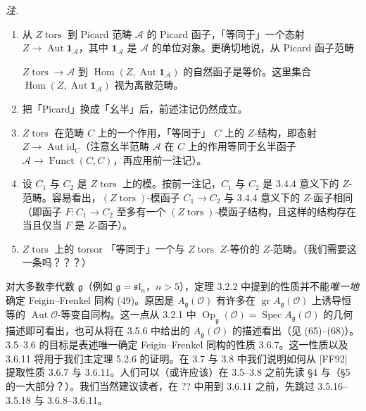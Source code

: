 \emph{注.}
\begin{enumerate}[label=(\roman*),leftmargin=2.2em]
  \item 从 $Z\operatorname{tors}$ 到 Picard 范畴 $\mathcal{A}$ 的 Picard 函子，「等同于」一个态射 $Z\to\operatorname{Aut}\mathbf{1}_{\mathcal{A}}$，其中 $\mathbf{1}_{\mathcal{A}}$ 是 $\mathcal{A}$ 的单位对象。更确切地说，从 Picard 函子范畴

$Z\operatorname{tors}\to\mathcal{A}$ 到 $\operatorname{Hom}(Z,\operatorname{Aut}\mathbf{1}_{\mathcal{A}})$ 的自然函子是等价。这里集合 $\operatorname{Hom}(Z,\operatorname{Aut}\mathbf{1}_{\mathcal{A}})$ 视为离散范畴。
  \item 把「Picard」换成「幺半」后，前述注记仍然成立。
  \item $Z\operatorname{tors}$ 在范畴 $C$ 上的一个作用，「等同于」 $C$ 上的 $Z$-结构，即态射 $Z\to\operatorname{Aut}\mathrm{id}_{C}$（注意幺半范畴 $\mathcal{A}$ 在 $C$ 上的作用等同于幺半函子 $\mathcal{A}\to\operatorname{Funct}(C,C)$，再应用前一注记）。
  \item 设 $C_{1}$ 与 $C_{2}$ 是 $Z\operatorname{tors}$ 上的模。按前一注记，$C_{1}$ 与 $C_{2}$ 是 3.4.4 意义下的 $Z$-范畴。容易看出，$(Z\operatorname{tors})$-模函子 $C_{1}\to C_{2}$ 与 3.4.4 意义下的 $Z$-函子相同（即函子 $F:C_{1}\to C_{2}$ 至多有一个 $(Z\operatorname{tors})$-模函子结构，且这样的结构存在当且仅当 $F$ 是 $Z$-函子）。
  \item $Z\operatorname{tors}$ 上的 torsor 「等同于」一个与 $Z\operatorname{tors}$ $Z$-等价的 $Z$-范畴。（我们需要这一条吗？？？）
\end{enumerate}

对大多数李代数 $\mathfrak{g}$（例如 $\mathfrak{g}=\mathfrak{sl}_{n}$，$n>5$），定理 3.2.2 中提到的性质并不能\emph{唯一地}确定 Feigin–Frenkel 同构 (49)。原因是 $A_{\mathfrak{g}}(\mathcal{O})$ 有许多在 $\operatorname{gr}A_{\mathfrak{g}}(\mathcal{O})$ 上诱导恒等的 $\operatorname{Aut}\mathcal{O}$-等变自同构。这一点从 3.2.1 中 $\operatorname{Op}_{\mathfrak{g}}(\mathcal{O})=\operatorname{Spec}A_{\mathfrak{g}}(\mathcal{O})$ 的几何描述即可看出，也可从将在 3.5.6 中给出的 $A_{\mathfrak{g}}(\mathcal{O})$ 的描述看出（见 (65)–(68)）。3.5–3.6 的目标是表述唯一确定 Feigin–Frenkel 同构的性质 3.6.7。这一性质以及 3.6.11 将用于我们主定理 5.2.6 的证明。在 3.7 与 3.8 中我们说明如何从 [FF92] 提取性质 3.6.7 与 3.6.11。人们可以（或许应该）在 3.5–3.8 之前先读 §4 与（§5 的一大部分？）。我们当然建议读者，在 ?? 中用到 3.6.11 之前，先跳过 3.5.16–3.5.18 与 3.6.8–3.6.11。

